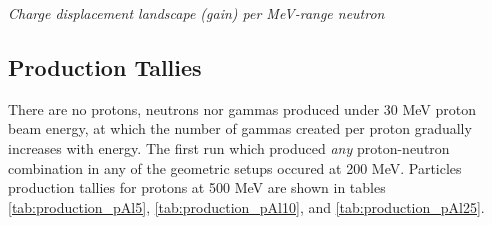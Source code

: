 \documentclass[11pt]{article}
\makeatletter
\newenvironment{figurehere}
{\def\@captype{figure}}{}
\makeatother
\begin{document}
\begin{multicols}{2}
\vspace{0.15 cm}
\begin{figurehere}
\centering
{}
\caption{\small \emph{Charge displacement landscape (gain) per MeV-range neutron}}
\label{fig:nChargeDep_MeV}
\end{figurehere}
\vspace{0.15 cm}


\subsection{Production Tallies}

There are no protons, neutrons nor gammas produced under 30 MeV proton beam energy, at which the number of gammas created per proton gradually increases with energy.  The first run which produced \emph{any} proton-neutron combination in any of the geometric setups occured at 200 MeV.  Particles production tallies for protons at 500 MeV are shown in tables \ref{tab:production_pAl5}, \ref{tab:production_pAl10}, and \ref{tab:production_pAl25}.


\end{multicols}
\end{document}
